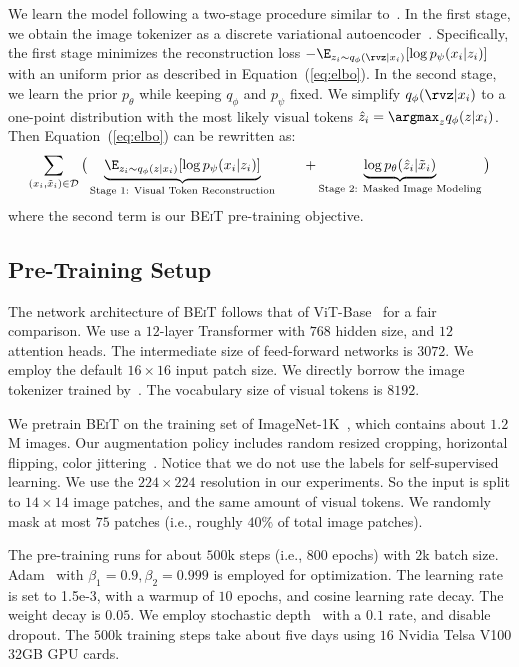 \documentclass{article}
\newcommand\our{\textsc{BEiT}}
\begin{document}
We learn the model following a two-stage procedure similar to~\citep{vqvae,vqvae2}.
In the first stage, we obtain the image tokenizer as a discrete variational autoencoder~\citep{dalle}.
Specifically, the first stage minimizes the reconstruction loss $-\E_{z_i\sim q_{\phi}( \rvz|x_i)}[\log p_{\psi}(x_i|z_i)]$ with an uniform prior as described in Equation~(\ref{eq:elbo}).
In the second stage, we learn the prior $p_{\theta}$ while keeping $q_{\phi}$ and $p_{\psi}$ fixed.
We simplify $q_{\phi}(\rvz|x_i)$ to a one-point distribution with the most likely visual tokens $\hat{z}_i = \argmax_{z}{q_{\phi}(z|x_i)}$.
Then Equation~(\ref{eq:elbo}) can be rewritten as:
\begin{align}
\sum_{(x_i, \tilde{x}_i) \in \mathcal{D}} \big( \underbrace{\E_{z_i\sim q_{\phi}( z|x_i)}[\log p_{\psi}(x_i|z_i)]}_{\text{Stage 1: Visual Token Reconstruction}} ~~~~~~ + \underbrace{ \log p_{\theta}(\hat{z}_i | \tilde{x}_i) }_{\text{Stage 2: Masked Image Modeling}} \big)
\label{eq:beit:objective}
\end{align}
where the second term is our \our{} pre-training objective.


\subsection{Pre-Training Setup}
\label{sec:pt:setup}

The network architecture of \our{} follows that of ViT-Base~\citep{vit} for a fair comparison.
We use a $12$-layer Transformer with $768$ hidden size, and $12$ attention heads. The intermediate size of feed-forward networks is $3072$.
We employ the default $16 \times 16$ input patch size.
We directly borrow the image tokenizer trained by~\citep{dalle}. The vocabulary size of visual tokens is $8192$.

We pretrain \our{} on the training set of ImageNet-1K~\citep{imagenet}, which contains about $1.2$M images.
Our augmentation policy includes random resized cropping, horizontal flipping, color jittering~\citep{wu2018unsupervised}.
Notice that we do not use the labels for self-supervised learning.
We use the $224 \times 224$ resolution in our experiments.
So the input is split to $14 \times 14$ image patches, and the same amount of visual tokens.
We randomly mask at most $75$ patches (i.e., roughly $40\%$ of total image patches).

The pre-training runs for about $500$k steps (i.e., $800$ epochs) with $2$k batch size.
Adam~\citep{adamw} with $\beta_1=0.9, \beta_2=0.999$ is employed for optimization. The learning rate is set to 1.5e-3, with a warmup of $10$ epochs, and cosine learning rate decay.
The weight decay is $0.05$.
We employ stochastic depth~\citep{stochastic:depth} with a $0.1$ rate, and disable dropout.
The $500$k training steps take about five days using $16$ Nvidia Telsa V100 32GB GPU cards.
\end{document}
